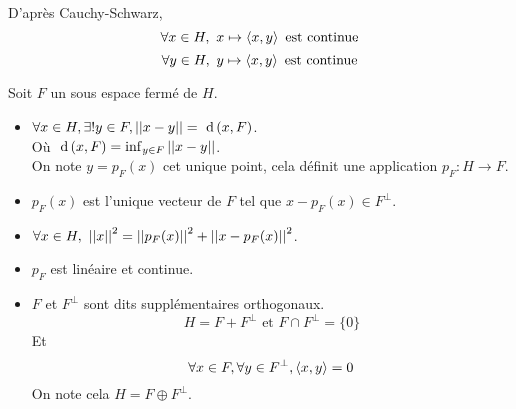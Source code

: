 \begin{remarque}
	D'après Cauchy-Schwarz,
	$$ \forall x \in H, \  x \mapsto \left\langle x, y \right\rangle \text{ est continue} $$
	$$ \forall y \in H, \  y \mapsto \left\langle x, y \right\rangle \text{ est continue} $$
\end{remarque}

\begin{theorem}
	Soit $F$ un sous espace fermé de $H$.

	\begin{itemize}
		\item $\forall x \in H, \exists ! y \in F, \left|\left|x-y\right|\right| = \text{ d}\left(x, F\right)$.\\
		      Où $\text{ d}\left(x, F\right) = \inf_{y \in F} \left|\left|x-y\right|\right|$.\\
		      On note $y = p_F(x)$ cet unique point, cela définit une application $p_F : H \to F$.
		\item $p_F(x)$ est l'unique vecteur de $F$ tel que $x - p_F(x) \in F^\perp$.
		\item $\forall x \in H,\ \left|\left|x\right|\right|^2 = \left|\left|p_F(x)\right|\right|^2 + \left|\left|x - p_F(x)\right|\right|^2$.
		\item $p_F$ est linéaire et continue.
		\item $F$ et $F^\perp$ sont dits supplémentaires orthogonaux.\\
		      $$ H = F + F^\perp \text{ et } F \cap F^\perp = \{0\} $$
		      Et $$\forall x \in F , \forall y \in F^\perp, \left\langle x, y \right\rangle = 0$$
		      On note cela $H = F \oplus F^\perp$.
	\end{itemize}
\end{theorem}


